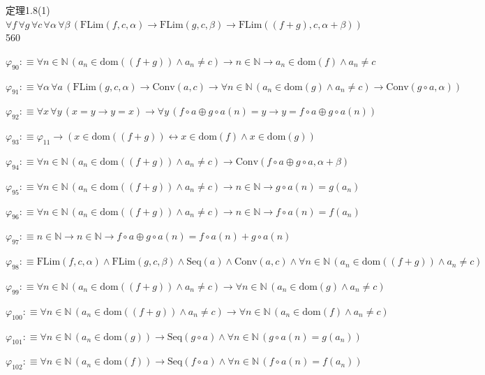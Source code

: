 \begin{fullproof}{定理1.8(1)}{$\forall f\,\forall g\,\forall c\,\forall \alpha\,\forall \beta\,(\mathrm{FLim}(f,c,\alpha) \to \mathrm{FLim}(g,c,\beta) \to \mathrm{FLim}((f + g),c,\alpha + \beta))$}{560}
\begin{abbrevlist}
\item $\varphi_{90} :\equiv \forall n \in \mathbb{N}\,(a_{n} \in \mathrm{dom}((f + g)) \land a_{n} \neq c) \to n \in \mathbb{N} \to a_{n} \in \mathrm{dom}(f) \land a_{n} \neq c$
\item $\varphi_{91} :\equiv \forall \alpha\,\forall a\,(\mathrm{FLim}(g,c,\alpha) \to \mathrm{Conv}(a,c) \to \forall n \in \mathbb{N}\,(a_{n} \in \mathrm{dom}(g) \land a_{n} \neq c) \to \mathrm{Conv}(g \circ a,\alpha))$
\item $\varphi_{92} :\equiv \forall x\,\forall y\,(x = y \to y = x) \to \forall y\,(f \circ a \oplus g \circ a(n) = y \to y = f \circ a \oplus g \circ a(n))$
\item $\varphi_{93} :\equiv \varphi_{11} \to (x \in \mathrm{dom}((f + g)) \leftrightarrow x \in \mathrm{dom}(f) \land x \in \mathrm{dom}(g))$
\item $\varphi_{94} :\equiv \forall n \in \mathbb{N}\,(a_{n} \in \mathrm{dom}((f + g)) \land a_{n} \neq c) \to \mathrm{Conv}(f \circ a \oplus g \circ a,\alpha + \beta)$
\item $\varphi_{95} :\equiv \forall n \in \mathbb{N}\,(a_{n} \in \mathrm{dom}((f + g)) \land a_{n} \neq c) \to n \in \mathbb{N} \to g \circ a(n) = g(a_{n})$
\item $\varphi_{96} :\equiv \forall n \in \mathbb{N}\,(a_{n} \in \mathrm{dom}((f + g)) \land a_{n} \neq c) \to n \in \mathbb{N} \to f \circ a(n) = f(a_{n})$
\item $\varphi_{97} :\equiv n \in \mathbb{N} \to n \in \mathbb{N} \to f \circ a \oplus g \circ a(n) = f \circ a(n) + g \circ a(n)$
\item $\varphi_{98} :\equiv \mathrm{FLim}(f,c,\alpha) \land \mathrm{FLim}(g,c,\beta) \land \mathrm{Seq}(a) \land \mathrm{Conv}(a,c) \land \forall n \in \mathbb{N}\,(a_{n} \in \mathrm{dom}((f + g)) \land a_{n} \neq c)$
\item $\varphi_{99} :\equiv \forall n \in \mathbb{N}\,(a_{n} \in \mathrm{dom}((f + g)) \land a_{n} \neq c) \to \forall n \in \mathbb{N}\,(a_{n} \in \mathrm{dom}(g) \land a_{n} \neq c)$
\item $\varphi_{100} :\equiv \forall n \in \mathbb{N}\,(a_{n} \in \mathrm{dom}((f + g)) \land a_{n} \neq c) \to \forall n \in \mathbb{N}\,(a_{n} \in \mathrm{dom}(f) \land a_{n} \neq c)$
\item $\varphi_{101} :\equiv \forall n \in \mathbb{N}\,(a_{n} \in \mathrm{dom}(g)) \to \mathrm{Seq}(g \circ a) \land \forall n \in \mathbb{N}\,(g \circ a(n) = g(a_{n}))$
\item $\varphi_{102} :\equiv \forall n \in \mathbb{N}\,(a_{n} \in \mathrm{dom}(f)) \to \mathrm{Seq}(f \circ a) \land \forall n \in \mathbb{N}\,(f \circ a(n) = f(a_{n}))$

\end{abbrevlist}
\end{fullproof}
